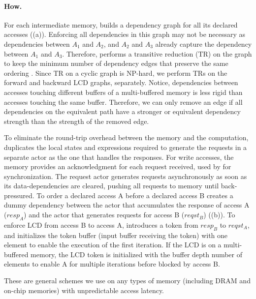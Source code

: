 \paragraph{How.} For each intermediate memory, \name{} builds a dependency graph for all its declared accesses ((a)).
Enforcing all dependencies in this graph may not be necessary as dependencies between $A_1$ and $A_2$, and $A_2$ and $A_3$ already capture the dependency between $A_1$ and $A_3$.
Therefore, \name{} performs a transitive reduction (TR) on the graph to keep the minimum number of dependency edges that preserve the same ordering \cite{tr}.
Since TR on a cyclic graph is NP-hard, we perform TRs on the forward and backward LCD graphs, separately.
Notice, dependencies between accesses touching different buffers of a multi-buffered memory is less rigid than accesses touching the same buffer.
Therefore, we can only remove an edge if all dependencies on the equivalent path have a stronger or equivalent dependency strength than the strength of the removed edge.

To eliminate the round-trip overhead between the memory and the computation, 
\name{} duplicates the local states and expressions required to generate the requests in a separate actor as the one that handles the responses.
For write accesses, the memory provides an acknowledgment for each request received, used by \name for synchronization.
The request actor generates requests asynchronously as soon as its data-dependencies are cleared, pushing all requests to memory until back-pressured.
To order a declared access A before a declared access B
\name creates a dummy dependency between the actor that accumulates the response of access A ($resp_A$) and the actor that generates requests for access B ($reqst_B$) ((b)).
To enforce LCD from access B to access A, \name introduces a token from $resp_B$ to $reqst_A$, and initializes the token buffer (input buffer receiving the token) with one element to enable the execution of the first iteration.
If the LCD is on a multi-buffered memory, the LCD token is initialized with the buffer depth number of elements to enable A for multiple iterations before blocked by access B.

These are general schemes we use on any types of memory (including DRAM and on-chip memories) with unpredictable access latency.

